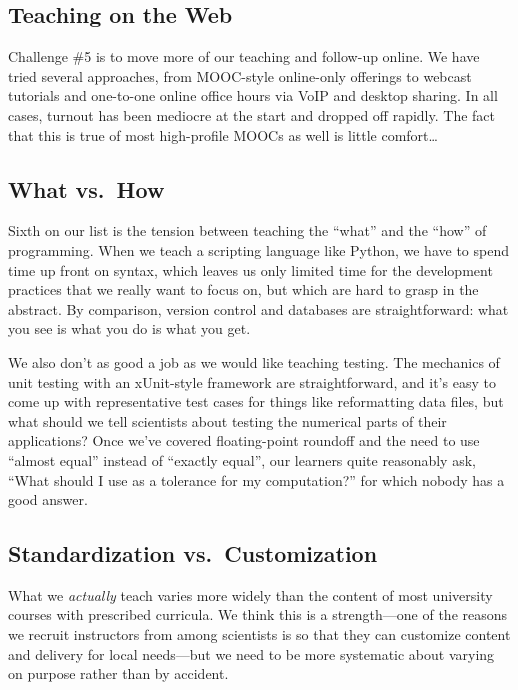 \documentclass[10pt,a4paper,twocolumn]{article}
\begin{document}
\subsection*{Teaching on the Web}

Challenge \#5 is to move more of our teaching and follow-up online. We
have tried several approaches, from MOOC-style online-only offerings to
webcast tutorials and one-to-one online office hours via VoIP and
desktop sharing. In all cases, turnout has been mediocre at the start
and dropped off rapidly. The fact that this is true of most high-profile
MOOCs as well is little comfort\ldots{}

\subsection*{What vs.~How}

Sixth on our list is the tension between teaching the ``what'' and the
``how'' of programming. When we teach a scripting language like Python,
we have to spend time up front on syntax, which leaves us only limited
time for the development practices that we really want to focus on, but
which are hard to grasp in the abstract. By comparison, version control
and databases are straightforward: what you see is what you do is what
you get.

We also don't as good a job as we would like teaching testing. The
mechanics of unit testing with an xUnit-style framework are
straightforward, and it's easy to come up with representative test cases
for things like reformatting data files, but what should we tell
scientists about testing the numerical parts of their applications? Once
we've covered floating-point roundoff and the need to use ``almost
equal'' instead of ``exactly equal'', our learners quite reasonably ask,
``What should I use as a tolerance for my computation?'' for which
nobody has a good answer.

\subsection*{Standardization vs.~Customization}

What we \emph{actually} teach varies more widely than the content of
most university courses with prescribed curricula. We think this is a
strength---one of the reasons we recruit instructors from among
scientists is so that they can customize content and delivery for
local needs---but we need to be more systematic about varying on
purpose rather than by accident.
\end{document}
